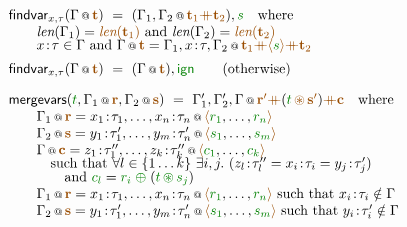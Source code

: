 \begin{figure}[t]
\vspace{1em}
\begin{equation*}
\begin{array}{l}
\ident{findvar}_{x,\tau}(\coctx{\Gamma}{\aclrd{\textbf{t}}})~=~(\coctx{\Gamma_1,\Gamma_2}{\aclrd{\textbf{t}_1} \atimes \aclrd{\textbf{t}_2}}), \cclrd{s} \quad \textnormal{where} \\
\qquad \xlen{\Gamma_1} = \alen{\aclrd{\textbf{t}_1}}~\textnormal{and}~\xlen{\Gamma_2} = \alen{\aclrd{\textbf{t}_2}} \\[-0.25em]
\qquad x\!:\!\tau \in \Gamma~\textnormal{and}~
  \coctx{\Gamma}{\aclrd{\textbf{t}}} = \coctx{\Gamma_1, x\!:\!\tau, \Gamma_2}{\aclrd{\textbf{t}_1} \atimes \alift{\cclrd{s}} \atimes \aclrd{\textbf{t}_2}}
\\[0.5em]
\ident{findvar}_{x,\tau}(\coctx{\Gamma}{\aclrd{\textbf{t}}})~=~ (\coctx{\Gamma}{\aclrd{\textbf{t}}}), \czero \qquad (\textnormal{otherwise})
\\[1em]
\ident{mergevars}(\cclrd{t}, \coctx{\Gamma_1}{\aclrd{\textbf{r}}}, \coctx{\Gamma_2}{\aclrd{\textbf{s}}})~=~
  \coctx{\Gamma'_1, \Gamma'_2, \Gamma}{\aclrd{\textbf{r}'}\atimes(\cclrd{t} \,\aseq\, \aclrd{\textbf{s}'}) \atimes \aclrd{\textbf{c}} } \quad \textnormal{where}\\
\qquad \coctx{\Gamma_1}{\aclrd{\textbf{r}}} =
    \coctx{x_1\!:\!\tau_1, \ldots, x_n\!:\!\tau_n}{\alift{\cclrd{r_1}, \ldots, \cclrd{r_n}}} \\
\qquad \coctx{\Gamma_2}{\aclrd{\textbf{s}}} =
    \coctx{y_1\!:\!\tau'_1, \ldots, y_m\!:\!\tau'_n}{\alift{\cclrd{s_1}, \ldots, \cclrd{s_m}}} \\
\qquad \coctx{\Gamma}{\aclrd{\textbf{c}}} =
    \coctx{z_1\!:\!\tau''_1, \ldots, z_k\!:\!\tau''_k}{\alift{\cclrd{c_1}, \ldots, \cclrd{c_k}}} \\[-0.25em]
\qquad\quad \textnormal{such that}~\forall l\in \{1 \ldots k\}~\exists i,j.~(z_l\!:\!\tau''_l = x_i\!:\!\tau_i = y_j\!:\!\tau'_j) \\[-0.25em]
\qquad\qquad \textnormal{and}~\cclrd{c_l} = \cclrd{r_i} \;\cpar\; (\cclrd{t} \,\cseq\, \cclrd{s_j}) \\
\qquad \coctx{\Gamma_1}{\aclrd{\textbf{r}}} =
    \coctx{x_1\!:\!\tau_1, \ldots, x_n\!:\!\tau_n}{\alift{\cclrd{r_1}, \ldots, \cclrd{r_n}}}
    ~\textnormal{such that}~x_i\!:\!\tau_i \notin \Gamma \\
\qquad \coctx{\Gamma_2}{\aclrd{\textbf{s}}} =
    \coctx{y_1\!:\!\tau'_1, \ldots, y_m\!:\!\tau'_n}{\alift{\cclrd{s_1}, \ldots, \cclrd{s_m}}}
    ~\textnormal{such that}~y_i\!:\!\tau'_i \notin \Gamma \\
\end{array}
\end{equation*}

\label{fig:struct-syntax-types}
\end{figure}

